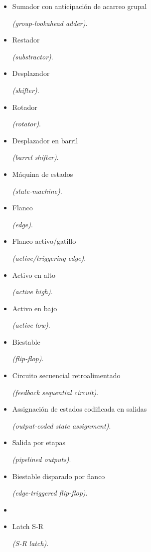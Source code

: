 \begin{itemize}
    \item \hypertarget{group-lookahead_adder}{Sumador con anticipación de acarreo grupal} \emph{(group-lookahead adder)}.
    \item \hypertarget{substractor}{Restador} \emph{(substractor)}.
    \item \hypertarget{shifter}{Desplazador} \emph{(shifter)}.
    \item \hypertarget{rotator}{Rotador} \emph{(rotator)}.
    \item \hypertarget{barrel_shifter}{Desplazador en barril} \emph{(barrel shifter)}.
    \item \hypertarget{state_machine}{Máquina de estados} \emph{(state-machine)}.
    \item \hypertarget{edge}{Flanco} \emph{(edge)}.
    \item \hypertarget{active_edge}{Flanco activo/gatillo} \emph{(active/triggering edge)}.
    \item \hypertarget{active_high}{Activo en alto} \emph{(active high)}.
    \item \hypertarget{active_low}{Activo en bajo} \emph{(active low)}.
    \item \hypertarget{flip-flop}{Biestable} \emph{(flip-flop)}.
    \item \hypertarget{feedback_sequential_circuit}{Circuito secuencial retroalimentado} \emph{(feedback sequential circuit)}.
    \item \hypertarget{output-coded_state_assignment}{Assignación de estados codificada en salidas} \emph{(output-coded state assignment)}.
    \item \hypertarget{pipelined_outputs}{Salida por etapas} \emph{(pipelined outputs)}.
    \item \hypertarget{edge-triggered_flip-flop}{Biestable disparado por flanco} \emph{(edge-triggered flip-flop)}.
    \item \item \hypertarget{sr_latch}{Latch S-R} \emph{(S-R latch)}.
\end{itemize}